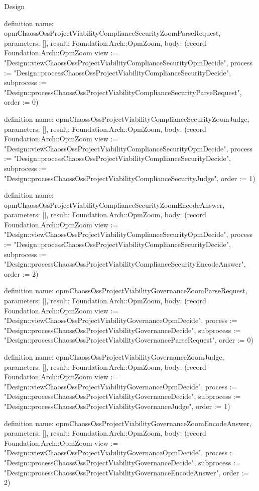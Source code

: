 \begin{lexlean}{Design}
\begin{semanticmodule}
definition{
  name: opmChaossOssProjectViabilityComplianceSecurityZoomParseRequest,
  parameters: [],
  result: Foundation.Arch::OpmZoom,
  body: (record Foundation.Arch::OpmZoom {view := "Design::viewChaossOssProjectViabilityComplianceSecurityOpmDecide", process := "Design::processChaossOssProjectViabilityComplianceSecurityDecide", subprocess := "Design::processChaossOssProjectViabilityComplianceSecurityParseRequest", order := 0})
}

definition{
  name: opmChaossOssProjectViabilityComplianceSecurityZoomJudge,
  parameters: [],
  result: Foundation.Arch::OpmZoom,
  body: (record Foundation.Arch::OpmZoom {view := "Design::viewChaossOssProjectViabilityComplianceSecurityOpmDecide", process := "Design::processChaossOssProjectViabilityComplianceSecurityDecide", subprocess := "Design::processChaossOssProjectViabilityComplianceSecurityJudge", order := 1})
}

definition{
  name: opmChaossOssProjectViabilityComplianceSecurityZoomEncodeAnswer,
  parameters: [],
  result: Foundation.Arch::OpmZoom,
  body: (record Foundation.Arch::OpmZoom {view := "Design::viewChaossOssProjectViabilityComplianceSecurityOpmDecide", process := "Design::processChaossOssProjectViabilityComplianceSecurityDecide", subprocess := "Design::processChaossOssProjectViabilityComplianceSecurityEncodeAnswer", order := 2})
}

definition{
  name: opmChaossOssProjectViabilityGovernanceZoomParseRequest,
  parameters: [],
  result: Foundation.Arch::OpmZoom,
  body: (record Foundation.Arch::OpmZoom {view := "Design::viewChaossOssProjectViabilityGovernanceOpmDecide", process := "Design::processChaossOssProjectViabilityGovernanceDecide", subprocess := "Design::processChaossOssProjectViabilityGovernanceParseRequest", order := 0})
}

definition{
  name: opmChaossOssProjectViabilityGovernanceZoomJudge,
  parameters: [],
  result: Foundation.Arch::OpmZoom,
  body: (record Foundation.Arch::OpmZoom {view := "Design::viewChaossOssProjectViabilityGovernanceOpmDecide", process := "Design::processChaossOssProjectViabilityGovernanceDecide", subprocess := "Design::processChaossOssProjectViabilityGovernanceJudge", order := 1})
}

definition{
  name: opmChaossOssProjectViabilityGovernanceZoomEncodeAnswer,
  parameters: [],
  result: Foundation.Arch::OpmZoom,
  body: (record Foundation.Arch::OpmZoom {view := "Design::viewChaossOssProjectViabilityGovernanceOpmDecide", process := "Design::processChaossOssProjectViabilityGovernanceDecide", subprocess := "Design::processChaossOssProjectViabilityGovernanceEncodeAnswer", order := 2})
}


\end{semanticmodule}
\end{lexlean}
